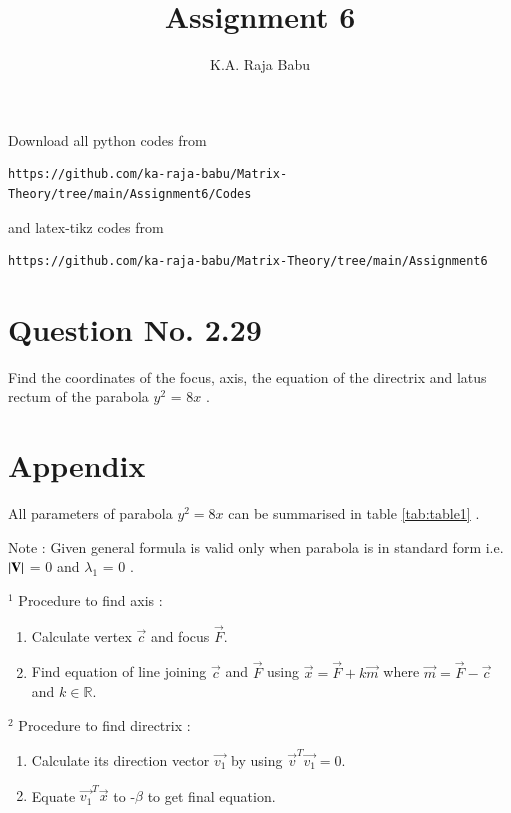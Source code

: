 \documentclass[journal,12pt,twocolumn]{IEEEtran}
\begin{document}
     \def\rightbox#1{\makebox[0in][r]{#1}}
     \def\centbox#1{\makebox[0in]{#1}}
     \def\topbox#1{\raisebox{-\baselineskip}[0in][0in]{#1}}
     \def\midbox#1{\raisebox{-0.5\baselineskip}[0in][0in]{#1}}
\vspace{3cm}
\title{Assignment 6}
\author{K.A. Raja Babu}
\maketitle
\newpage
\bigskip
\renewcommand{\thefigure}{\theenumi}
\renewcommand{\thetable}{\theenumi}
Download all python codes from 
\begin{lstlisting}
https://github.com/ka-raja-babu/Matrix-Theory/tree/main/Assignment6/Codes
\end{lstlisting}
%
and latex-tikz codes from 
%
\begin{lstlisting}
https://github.com/ka-raja-babu/Matrix-Theory/tree/main/Assignment6
\end{lstlisting}
%
\section{Question No. 2.29}
Find the coordinates of the focus, axis, the equation of the directrix and latus rectum of the parabola $y^2$ = 8$x$ .
%
\section{Appendix}

All parameters of parabola $y^2=8x$ can be summarised in table \ref{tab:table1} .

Note : Given general formula is valid only when parabola is in standard form i.e. $\left\vert\mathbf{V}\right\vert$ = 0 and $\lambda_1$ = 0 . 

$^{1}$ Procedure to find axis :
\begin{enumerate}
\item Calculate vertex $\vec{c}$ and focus $\vec{F}$.

\item Find equation of line joining $\vec{c}$ and $\vec{F}$ using           $\vec{x}=\vec{F} +k\vec{m}$ where $\vec{m}=\vec{F}-\vec{c}$ and $k \in \mathbb{R}.$
\end{enumerate}

$^{2}$ Procedure to find directrix :
\begin{enumerate}
\item Calculate its direction vector $\vec{v_1}$ by using $\vec{v}^T\vec{v_1} =        0.$
    \item Equate $\vec{v_1}^T\vec{x}$ to -$\beta$ to get final equation.
\end{enumerate}
\end{document}
